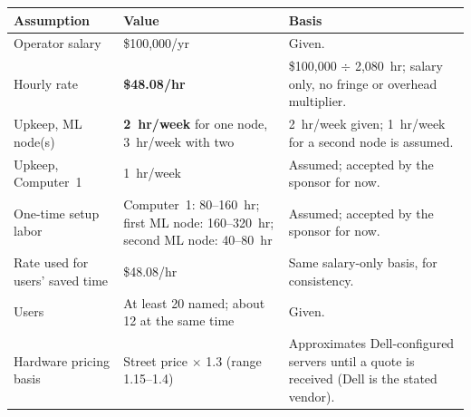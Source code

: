 
{\small
\begin{tabularx}{\textwidth}{@{}Y{0.857}Y{0.771}Y{1.372}@{}}
  \toprule
  Assumption & Value & Basis \\
  \midrule
  Operator salary & \$100,000/yr & Given. \\
  Hourly rate & \textbf{\$48.08/hr} & \$100,000 $\div$ 2,080~hr; salary only, no fringe or overhead multiplier. \\
  Upkeep, ML node(s) & \textbf{2~hr/week} for one node, 3~hr/week with two & 2~hr/week given; 1~hr/week for a second node is assumed. \\
  Upkeep, Computer~1 & 1~hr/week & Assumed; accepted by the sponsor for now. \\
  One-time setup labor & Computer~1: 80--160~hr; first ML node: 160--320~hr; second ML node: 40--80~hr & Assumed; accepted by the sponsor for now. \\
  Rate used for users' saved time & \$48.08/hr & Same salary-only basis, for consistency. \\
  Users & At least 20 named; about 12 at the same time & Given. \\
  Hardware pricing basis & Street price $\times$ 1.3 (range 1.15--1.4) & Approximates Dell-configured servers until a quote is received (Dell is the stated vendor). \\
  \bottomrule
\end{tabularx}}
